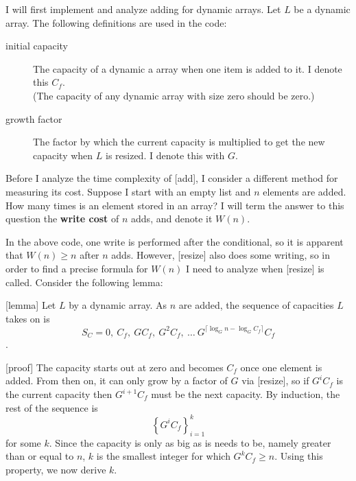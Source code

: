 \documentclass{article}
\newcommand{\nwritesfn}{W}
\newcommand{\varnitems}{n}
\newcommand{\listname}{L}
\newcommand{\initcapacity}{C_f}
\newcommand{\growthfactor}{G}
\begin{document}
	I will first implement and analyze adding for dynamic arrays. Let $\listname$ be a dynamic array. The following definitions are used in the code:
	
	\begin{description}
		\item[initial capacity] The capacity of a dynamic a array when one item is added to it. I denote this $\initcapacity$.\\
		(The capacity of any dynamic array with size zero should be zero.)
		\item[growth factor] The factor by which the current capacity is multiplied to get the new capacity when $\listname$ is resized. I denote this with $\growthfactor$.
	\end{description}
	
	
	Before I analyze the time complexity of [add], I consider a different method for measuring its cost. Suppose I start with an empty list and $\varnitems$ elements are added. How many times is an element stored in an array? I will term the answer to this question the \textbf{write cost} of $\varnitems$ adds, and denote it $\nwritesfn(n)$.
	
	In the above code, one write is performed after the conditional, so it is apparent that $\nwritesfn(\varnitems) \geq \varnitems$ after $n$ adds. However, [resize] also does some writing, so in order to find a precise formula for $\nwritesfn(\varnitems)$ I need to analyze when [resize] is called. Consider the following lemma:
	
	[lemma]
	Let $\listname$ by a dynamic array. As $\varnitems$ are added, the sequence of capacities $\listname$ takes on is $$S_C = 0,\ \initcapacity,\ \growthfactor\initcapacity,\ \growthfactor^2\initcapacity,\ \ldots\ \growthfactor^{\lceil \log_{\growthfactor} \varnitems - \log_{\growthfactor} \initcapacity \rceil}\initcapacity$$.
	
	[proof]
	The capacity starts out at zero and becomes $\initcapacity$ once one element is added. From then on, it can only grow by a factor of $\growthfactor$ via [resize], so if $\growthfactor^i\initcapacity$ is the current capacity then $\growthfactor^{i + 1}\initcapacity$ must be the next capacity. By induction, the rest of the sequence is $$\left\{ \growthfactor^i\initcapacity \right\}_{i = 1}^k$$ for some $k$. Since the capacity is only as big as is needs to be, namely greater than or equal to $\varnitems$, $k$ is the smallest integer for which $\growthfactor^k\initcapacity \geq \varnitems$. Using this property, we now derive $k$.
	
\end{document}
